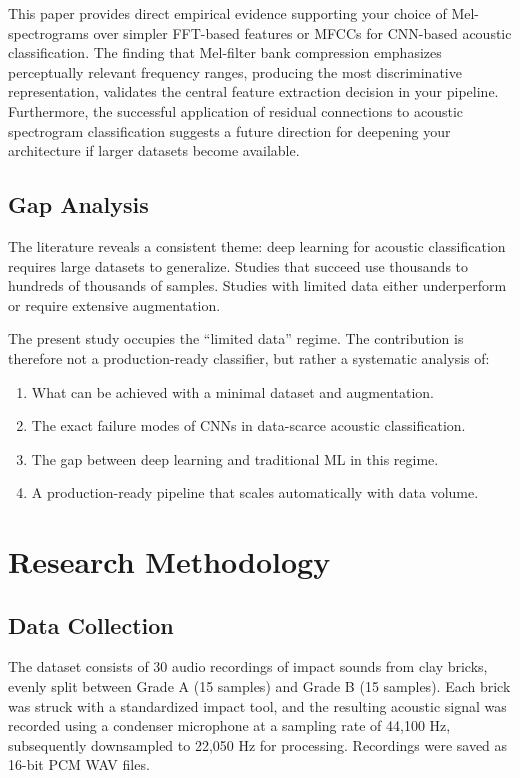 \documentclass[12pt,a4paper,oneside]{report}
\begin{document}
This paper provides direct empirical evidence supporting your choice of Mel-spectrograms over simpler FFT-based features or MFCCs for CNN-based acoustic classification. The finding that Mel-filter bank compression emphasizes perceptually relevant frequency ranges, producing the most discriminative representation, validates the central feature extraction decision in your pipeline. Furthermore, the successful application of residual connections to acoustic spectrogram classification suggests a future direction for deepening your architecture if larger datasets become available.

\section{Gap Analysis}

The literature reveals a consistent theme: deep learning for acoustic classification requires large datasets to generalize. Studies that succeed use thousands to hundreds of thousands of samples. Studies with limited data either underperform or require extensive augmentation.

The present study occupies the ``limited data'' regime. The contribution is therefore not a production-ready classifier, but rather a systematic analysis of:
\begin{enumerate}
    \item What can be achieved with a minimal dataset and augmentation.
    \item The exact failure modes of CNNs in data-scarce acoustic classification.
    \item The gap between deep learning and traditional ML in this regime.
    \item A production-ready pipeline that scales automatically with data volume.
\end{enumerate}

\chapter{Research Methodology}
\label{ch:methodology}

\section{Data Collection}

The dataset consists of 30 audio recordings of impact sounds from clay bricks, evenly split between Grade A (15 samples) and Grade B (15 samples). Each brick was struck with a standardized impact tool, and the resulting acoustic signal was recorded using a condenser microphone at a sampling rate of 44,100 Hz, subsequently downsampled to 22,050 Hz for processing. Recordings were saved as 16-bit PCM WAV files.
\end{document}
